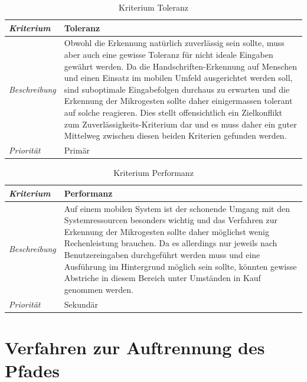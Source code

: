 \begin{table}[h!]
  \begin{center}
    \begin{tabular}{ m{2.2cm} |  p{10cm} }
    \emph{Kriterium} & Toleranz  \\ \hline
    \emph{Beschreibung} &

 Obwohl die Erkennung natürlich zuverlässig sein sollte, muss aber auch eine gewisse Toleranz für nicht ideale Eingaben gewährt werden. Da die Handschriften-Erkennung auf Menschen und einen Einsatz im mobilen Umfeld ausgerichtet werden soll, sind suboptimale Eingabefolgen durchaus zu erwarten und die Erkennung der Mikrogesten sollte daher einigermassen tolerant auf solche reagieren. Dies stellt offensichtlich ein Zielkonflikt zum Zuverlässigkeits-Kriterium dar und es muss daher ein guter Mittelweg zwischen diesen beiden Kriterien gefunden werden. 
\\ \hline
    \emph{Priorität} & Primär  \\
    \end{tabular}
  \end{center}
  \caption{Kriterium Toleranz}
  \label{kriterium_toleranz}
\end{table}

\begin{table}[h!]
  \begin{center}
    \begin{tabular}{ m{2.2cm} |  p{10cm} }
    \emph{Kriterium} & Performanz  \\ \hline
    \emph{Beschreibung} &

 Auf einem mobilen System ist der schonende Umgang mit den Systemressourcen besonders wichtig und das Verfahren zur Erkennung der Mikrogesten sollte daher möglichst wenig Rechenleistung brauchen. Da es allerdings nur jeweils nach Benutzereingaben durchgeführt werden muss und eine Ausführung im Hintergrund möglich sein sollte, könnten gewisse Abstriche in diesem Bereich unter Umständen in Kauf genommen werden.
\\ \hline
    \emph{Priorität} & Sekundär  \\
    \end{tabular}
  \end{center}
  \caption{Kriterium Performanz}
  \label{kriterium_performanz}
\end{table}

\section{Verfahren zur Auftrennung des Pfades}
